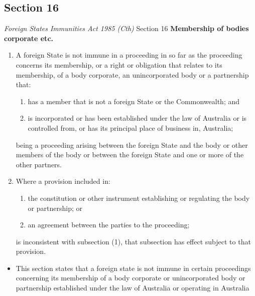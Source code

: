\subsection{Section 16}
\begin{statutedetails}{\textit{Foreign States Immunities Act 1985 (Cth)} Section 16}
    \flushleft
    \textbf{Membership of bodies corporate etc.}
    \begin{enumerate}
        \item A foreign State is not immune in a proceeding in so far as the proceeding concerns its membership, or a right or obligation that relates to its membership, of a body corporate, an unincorporated body or a partnership that:
        \begin{enumerate}
            \item has a member that is not a foreign State or the Commonwealth; and
            \item is incorporated or has been established under the law of Australia or is controlled from, or has its principal place of business in, Australia;
        \end{enumerate}
        being a proceeding arising between the foreign State and the body or other members of the body or between the foreign State and one or more of the other partners.
        \item Where a provision included in:
        \begin{enumerate}
            \item the constitution or other instrument establishing or regulating the body or partnership; or
            \item an agreement between the parties to the proceeding;
        \end{enumerate}
        is inconsistent with subsection (1), that subsection has effect subject to that provision.
    \end{enumerate}
\end{statutedetails}

\begin{itemize}
    \item This section states that a foreign state is not immune in certain proceedings concerning its membership of a body corporate or unincorporated body or partnership established under the law of Australia or operating in Australia
\end{itemize}

